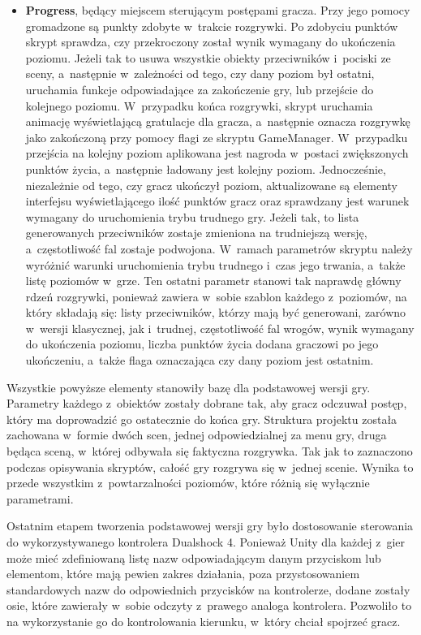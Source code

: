 \begin{itemize}
	\item \textbf{Progress}, będący miejscem sterującym postępami gracza. Przy jego pomocy gromadzone są punkty zdobyte w~trakcie rozgrywki. Po zdobyciu punktów skrypt sprawdza, czy przekroczony został wynik wymagany do ukończenia poziomu. Jeżeli tak to usuwa wszystkie obiekty przeciwników i~pociski ze sceny, a~następnie w~zależności od tego, czy dany poziom był ostatni, uruchamia funkcje odpowiadające za zakończenie gry, lub przejście do kolejnego poziomu. W~przypadku końca rozgrywki, skrypt uruchamia animację wyświetlającą gratulacje dla gracza, a~następnie oznacza rozgrywkę jako zakończoną przy pomocy flagi ze skryptu GameManager. W~przypadku przejścia na kolejny poziom aplikowana jest nagroda w~postaci zwiększonych punktów życia, a~następnie ładowany jest kolejny poziom. Jednocześnie, niezależnie od tego, czy gracz ukończył poziom, aktualizowane są elementy interfejsu wyświetlającego ilość punktów gracz oraz sprawdzany jest warunek wymagany do uruchomienia trybu trudnego gry. Jeżeli tak, to lista generowanych przeciwników zostaje zmieniona na trudniejszą wersję, a~częstotliwość fal zostaje podwojona. W~ramach parametrów skryptu należy wyróżnić warunki uruchomienia trybu trudnego i~czas jego trwania, a~także listę poziomów w~grze. Ten ostatni parametr stanowi tak naprawdę główny rdzeń rozgrywki, ponieważ zawiera w~sobie szablon każdego z~poziomów, na który składają się: listy przeciwników, którzy mają być generowani, zarówno w~wersji klasycznej, jak i~trudnej, częstotliwość fal wrogów, wynik wymagany do ukończenia poziomu, liczba punktów życia dodana graczowi po jego ukończeniu, a~także flaga oznaczająca czy dany poziom jest ostatnim.
\end{itemize}

Wszystkie powyższe elementy stanowiły bazę dla podstawowej wersji gry. Parametry każdego z~obiektów zostały dobrane tak, aby gracz odczuwał postęp, który ma doprowadzić go ostatecznie do końca gry. Struktura projektu została zachowana w~formie dwóch scen, jednej odpowiedzialnej za menu gry, druga będąca sceną, w~której odbywała się faktyczna rozgrywka. Tak jak to zaznaczono podczas opisywania skryptów, całość gry rozgrywa się w~jednej scenie. Wynika to przede wszystkim z~powtarzalności poziomów, które różnią się wyłącznie parametrami. 

Ostatnim etapem tworzenia podstawowej wersji gry było dostosowanie sterowania do wykorzystywanego kontrolera Dualshock 4. Ponieważ Unity dla każdej z~gier może mieć zdefiniowaną listę nazw odpowiadającym danym przyciskom lub elementom, które mają pewien zakres działania, poza przystosowaniem standardowych nazw do odpowiednich przycisków na kontrolerze, dodane zostały osie, które zawierały w~sobie odczyty z~prawego analoga kontrolera. Pozwoliło to na wykorzystanie go do kontrolowania kierunku, w~który chciał spojrzeć gracz.

